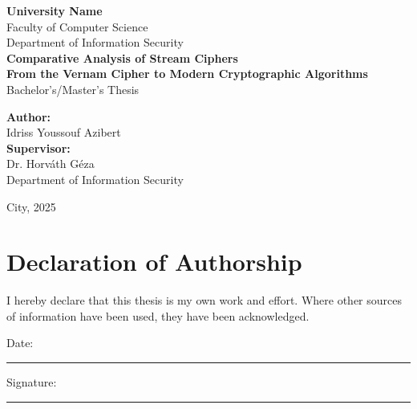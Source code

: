 \documentclass[12pt,a4paper,oneside]{report}
\begin{document}
\begin{titlepage}
    \centering
    \vspace*{1cm}
    
    {\LARGE\textbf{University Name}}\\[0.5cm]
    {\large Faculty of Computer Science}\\[0.5cm]
    {\large Department of Information Security}\\[3cm]
    
    {\Huge\bfseries Comparative Analysis of Stream Ciphers}\\[0.5cm]
    {\LARGE\bfseries From the Vernam Cipher to Modern Cryptographic Algorithms}\\[3cm]
    
    {\Large Bachelor's/Master's Thesis}\\[2cm]
    
    \begin{flushleft}
        \large
        \textbf{Author:}\\
        Idriss Youssouf Azibert\\[1cm]
        
        \textbf{Supervisor:}\\
        Dr. Horváth Géza\\
        Department of Information Security\\[2cm]
    \end{flushleft}
    
    \vfill
    
    {\large City, 2025}
    
\end{titlepage}

\chapter*{Declaration of Authorship}
\thispagestyle{empty}

I hereby declare that this thesis is my own work and effort. Where other sources of information have been used, they have been acknowledged.

\vspace{2cm}

\noindent
Date: \rule{4cm}{0.4pt} \hfill Signature: \rule{5cm}{0.4pt}
\end{document}
